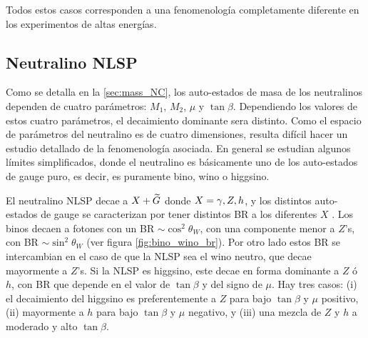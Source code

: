 


Todos estos casos corresponden a una fenomenología completamente diferente en
los experimentos de altas energías.


\subsection{Neutralino NLSP}

Como se detalla en la \cref{sec:mass_NC}, los auto-estados de masa de los
neutralinos dependen de cuatro parámetros: $M_1$, $M_2$, $\mu$ y $\tan\beta$.
Dependiendo los valores de estos cuatro parámetros, el decaimiento dominante
sera distinto. Como el espacio de parámetros del neutralino es de cuatro
dimensiones, resulta difícil hacer un estudio detallado de la fenomenología asociada.
En general se estudian algunos límites simplificados, donde el neutralino
es básicamente uno de los auto-estados de gauge puro, es decir, es puramente
bino, wino o higgsino.

El neutralino NLSP decae a $X + \widetilde{G}$ donde $X=\gamma,Z,h$, y los distintos
auto-estados de gauge se caracterizan por tener distintos BR a los diferentes $X$
\cite{Ruderman:2011vv}.
Los binos decaen a fotones con un BR $\sim \cos^2\theta_W$, con una componente
menor a $Z$'s, con BR $\sim \sin^2\theta_W$ (ver figura
\cref{fig:bino_wino_br}). Por otro lado estos BR se intercambian en el caso de
que la NLSP sea el wino neutro, que decae mayormente a $Z$'s. Si la NLSP es
higgsino, este decae en forma dominante a $Z$ ó $h$, con BR que depende en el
valor de $\tan\beta$ y del signo de $\mu$. Hay tres casos: (i) el decaimiento
del higgsino es preferentemente a $Z$ para bajo $\tan\beta$ y $\mu$ positivo,
(ii) mayormente a $h$ para bajo $\tan\beta$ y $\mu$ negativo, y (iii) una mezcla
de $Z$ y $h$ a moderado y alto $\tan\beta$.

